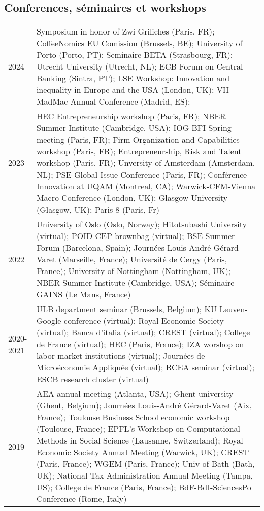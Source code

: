 \documentclass[12pt]{article}
\begin{document}
\subsection*{Conferences, séminaires et workshops}
\begin{footnotesize}
\begin{tabular}{p{1cm}p{13cm}}
2024 & Symposium in honor of Zwi Griliches (Paris, FR);  CoffeeNomics EU Comission (Brussels, BE); University of Porto (Porto, PT); Seminaire BETA (Strasbourg, FR); Utrecht University (Utrecht, NL); ECB Forum on Central Banking (Sintra, PT); LSE Workshop: Innovation and inequality in Europe and the USA (London, UK); VII MadMac Annual Conference (Madrid, ES); \\
2023 & HEC Entrepreneurship workshop (Paris, FR); NBER Summer Institute (Cambridge, USA); IOG-BFI Spring meeting (Paris, FR); Firm Organization and Capabilities workshop (Paris, FR); Entrepreneurship, Risk and Talent workshop (Paris, FR); Unversity of Amsterdam (Amsterdam, NL); PSE Global Issue Conference (Paris, FR); Conférence Innovation at UQAM (Montreal, CA); Warwick-CFM-Vienna Macro Conference (London, UK); Glasgow University (Glasgow, UK); Paris 8 (Paris, Fr) \\
2022 & University of Oslo (Oslo, Norway); Hitotsubashi University (virtual); POID-CEP brownbag (virtual); BSE Summer Forum (Barcelona, Spain); Journées Louis-André Gérard-Varet (Marseille, France); Université de Cergy (Paris, France); University of Nottingham (Nottingham, UK); NBER Summer Institute (Cambridge, USA); Séminaire GAINS (Le Mans, France) \\ 
 2020-2021 &  ULB department seminar (Brussels, Belgium); KU Leuven-Google conference (virtual);  Royal Economic Society (virtual); Banca d'italia (virtual); CREST (virtual); College de France (virtual); HEC (Paris, France); IZA worshop on labor market institutions (virtual); Journées de Microéconomie Appliquée (virtual); RCEA seminar (virtual); ESCB research cluster (virtual) \\
 2019 & AEA annual meeting (Atlanta, USA); Ghent university (Ghent, Belgium); Journées Louis-André Gérard-Varet (Aix, France); Toulouse Business School economic workshop (Toulouse, France); EPFL's Workshop on Computational Methods in Social Science (Lausanne, Switzerland); Royal Economic Society Annual Meeting (Warwick, UK); CREST (Paris, France); WGEM (Paris, France); Univ of Bath (Bath, UK); National Tax Administration Annual Meeting (Tampa, US); College de France (Paris, France); BdF-BdI-SciencesPo Conference (Rome, Italy) \\ 

\end{tabular}
\end{footnotesize}
\end{document}
